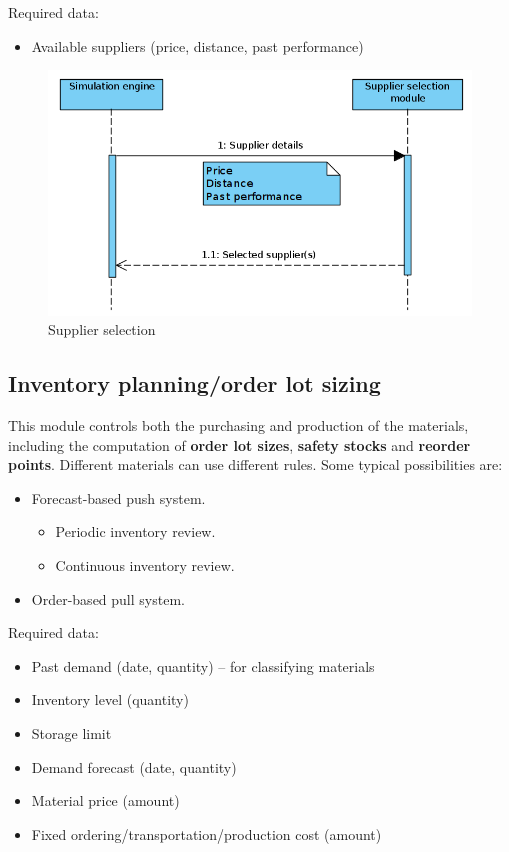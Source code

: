 \documentclass{article}
\begin{document}
\noindent Required data:
\begin{itemize}
\item Available suppliers (price, distance, past performance)
\end{itemize}

\begin{figure}[ht!]
	\center
	\includegraphics[width=.7\textwidth]{seq_supplier.png} 
	\caption{Supplier selection}\label{fig:seq_supplier}
\end{figure}


\subsection{Inventory planning/order lot sizing}\label{sec:inventory}

This module controls both the purchasing and production of the materials, including the computation of \textbf{order lot sizes}, \textbf{safety stocks} and \textbf{reorder points}. Different materials can use different rules. Some typical possibilities are:

\begin{itemize}
\item Forecast-based push system.
	\begin{itemize}
	\item Periodic inventory review.
	\item Continuous inventory review.
	\end{itemize}
\item Order-based pull system.
\end{itemize}

\noindent Required data:
\begin{itemize}
\item Past demand (date, quantity) -- for classifying materials
\item Inventory level (quantity)
\item Storage limit
\item Demand forecast (date, quantity)
\item Material price (amount)
\item Fixed ordering/transportation/production cost (amount)
\end{itemize}
\end{document}
